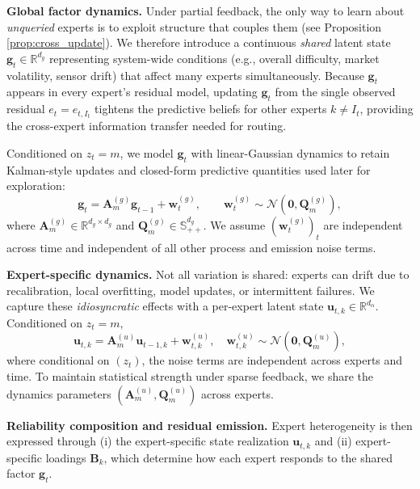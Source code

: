\textbf{Global factor dynamics.}
Under partial feedback, the only way to learn about \emph{unqueried} experts is to exploit structure
that couples them (see Proposition \ref{prop:cross_update}). We therefore introduce a continuous \emph{shared} latent state
\(\mathbf{g}_t\in\mathbb{R}^{d_g}\) representing system-wide conditions (e.g., overall difficulty,
market volatility, sensor drift) that affect many experts simultaneously. Because \(\mathbf{g}_t\)
appears in every expert's residual model, updating \(\mathbf{g}_t\) from the single observed residual
\(e_t=e_{t,I_t}\) tightens the predictive beliefs for other experts \(k\neq I_t\),
providing the cross-expert information transfer needed for routing.

Conditioned on \(z_t=m\), we model \(\mathbf{g}_t\) with linear-Gaussian dynamics to retain Kalman-style
updates and closed-form predictive quantities used later for exploration:
\begin{equation}
\label{eq:global_dynamics}
\mathbf{g}_t
=
\mathbf{A}^{(g)}_{m}\mathbf{g}_{t-1}+\mathbf{w}^{(g)}_{t},
\qquad
\mathbf{w}^{(g)}_{t}\sim\mathcal{N}(\mathbf{0},\mathbf{Q}^{(g)}_{m}),
\end{equation}
where \(\mathbf{A}^{(g)}_{m}\in\mathbb{R}^{d_g\times d_g}\) and
\(\mathbf{Q}^{(g)}_{m}\in\mathbb{S}^{d_g}_{++}\).
We assume \((\mathbf{w}^{(g)}_{t})_{t}\) are independent across time and independent of all other
process and emission noise terms.

\textbf{Expert-specific dynamics.}
Not all variation is shared: experts can drift due to recalibration, local overfitting, model
updates, or intermittent failures. We capture these \emph{idiosyncratic} effects with a per-expert
latent state \(\mathbf{u}_{t,k}\in\mathbb{R}^{d_\alpha}\). Conditioned on \(z_t=m\),
\begin{equation}
\label{eq:idiosyncratic_dynamics}
\mathbf{u}_{t,k}
=
\mathbf{A}^{(u)}_{m}\mathbf{u}_{t-1,k}+\mathbf{w}^{(u)}_{t,k},
\quad
\mathbf{w}^{(u)}_{t,k}\sim\mathcal{N}(\mathbf{0},\mathbf{Q}^{(u)}_{m}),
\end{equation}
where conditional on \((z_t)\), the noise terms are independent across experts and time.
To maintain statistical strength under sparse feedback, we share the dynamics parameters
\((\mathbf{A}^{(u)}_{m},\mathbf{Q}^{(u)}_{m})\) across experts.

\textbf{Reliability composition and residual emission.}
Expert heterogeneity is then expressed
through (i) the expert-specific state realization \(\mathbf{u}_{t,k}\) and (ii) expert-specific
loadings \(\mathbf{B}_k\), which determine how each expert responds to the
shared factor \(\mathbf{g}_t\).

